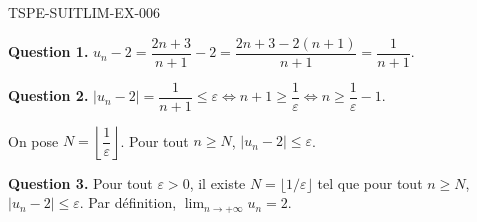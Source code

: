\begin{corrige}{TSPE-SUITLIM-EX-006}

\textbf{Question 1.} $u_n - 2 = \dfrac{2n+3}{n+1} - 2 = \dfrac{2n+3-2(n+1)}{n+1} = \dfrac{1}{n+1}$.


\textbf{Question 2.} $|u_n - 2| = \dfrac{1}{n+1} \leq \varepsilon \iff n+1 \geq \dfrac{1}{\varepsilon} \iff n \geq \dfrac{1}{\varepsilon} - 1$.

On pose $N = \left\lfloor \dfrac{1}{\varepsilon} \right\rfloor$. Pour tout $n \geq N$, $|u_n - 2| \leq \varepsilon$.

\textbf{Question 3.} Pour tout $\varepsilon > 0$, il existe $N = \lfloor 1/\varepsilon \rfloor$ tel que pour tout $n \geq N$, $|u_n - 2| \leq \varepsilon$. Par définition, $\boxed{\lim_{n \to +\infty} u_n = 2}$.

\end{corrige}
